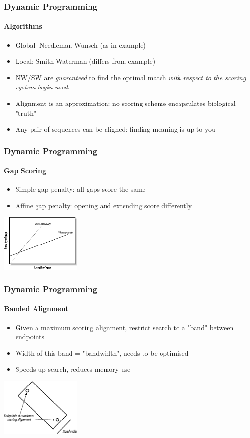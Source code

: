 \documentclass[table]{beamer}
\begin{document}
    \begin{frame}
     \frametitle{Dynamic Programming}
     \framesubtitle{Algorithms}
       \begin{itemize}
         \item<1-> Global: Needleman-Wunsch (as in example)
         \item<1-> Local: Smith-Waterman (differs from example)
         \item<2-> NW/SW are \emph{guaranteed} to find the optimal match \emph{with respect to the scoring system begin used}.
         \item<2-> Alignment is an approximation: no scoring scheme encapsulates biological "truth"
         \item<3-> Any pair of sequences can be aligned: finding meaning is up to you
       \end{itemize}
    \end{frame}   

    \begin{frame}
     \frametitle{Dynamic Programming}
     \framesubtitle{Gap Scoring}
       \begin{itemize}
         \item Simple gap penalty: all gaps score the same
         \item Affine gap penalty: opening and extending score differently
       \end{itemize}
       \begin{center}
         \includegraphics[width=0.3\textwidth]{images/gap_scores} 
       \end{center}
     \end{frame}  
   
    \begin{frame}
     \frametitle{Dynamic Programming}
     \framesubtitle{Banded Alignment}
       \begin{itemize}
         \item Given a maximum scoring alignment, restrict search to a "band" between endpoints
         \item Width of this band = "bandwidth", needs to be optimised
         \item Speeds up search, reduces memory use
       \end{itemize}
       \begin{center}
         \includegraphics[width=0.3\textwidth]{images/banded} 
       \end{center}
     \end{frame}     
\end{document}
